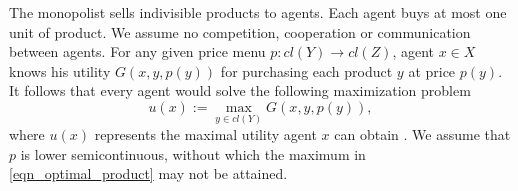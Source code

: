 \documentclass[a4paper, 11pt]{amsart}
\numberwithin{equation}{section}
\theoremstyle{plain}
\theoremstyle{definition}
\theoremstyle{remark}
\newcommand{\R}{\mathbf{R}}
\begin{document}
{The monopolist sells indivisible products to agents. Each agent buys at most one unit of product. We assume no competition, cooperation or communication between agents. For any given price menu $p: cl(Y) \rightarrow cl(Z)$, agent $x \in X$ knows his utility $G(x,y,p(y))$ for purchasing each product $y$ at price $p(y)$. It follows that every agent would solve the following maximization problem 
\begin{equation}\label{eqn_optimal_product}
	u(x):=\max_{y \in cl(Y)} G(x, y, p(y)),
\end{equation}
where $u(x)$ represents the maximal utility agent $x$ can obtain%
. We assume that $p$ is lower semicontinuous, without which the maximum in \eqref{eqn_optimal_product} may not be attained. } \medskip
\end{document}
